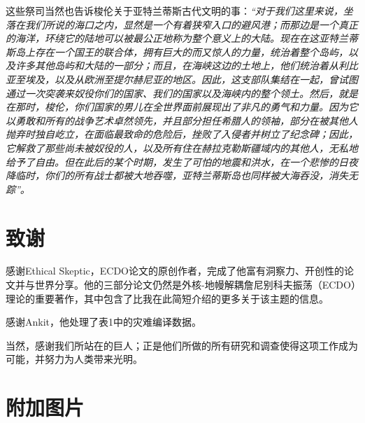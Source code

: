 \documentclass[10pt,twocolumn,letterpaper]{article}
\begin{document}
这些祭司当然也告诉梭伦关于亚特兰蒂斯古代文明的事：\textit{“对于我们这里来说，坐落在我们所说的海口之内，显然是一个有着狭窄入口的避风港；而那边是一个真正的海洋，环绕它的陆地可以被最公正地称为整个意义上的大陆。现在在这亚特兰蒂斯岛上存在一个国王的联合体，拥有巨大的而又惊人的力量，统治着整个岛屿，以及许多其他岛屿和大陆的一部分；而且，在海峡这边的土地上，他们统治着从利比亚至埃及，以及从欧洲至提尔赫尼亚的地区。因此，这支部队集结在一起，曾试图通过一次突袭来奴役你们的国家、我们的国家以及海峡内的整个领土。然后，就是在那时，梭伦，你们国家的男儿在全世界面前展现出了非凡的勇气和力量。因为它以勇敢和所有的战争艺术卓然领先，并且部分担任希腊人的领袖，部分在被其他人抛弃时独自屹立，在面临最致命的危险后，挫败了入侵者并树立了纪念碑；因此，它解救了那些尚未被奴役的人，以及所有住在赫拉克勒斯疆域内的其他人，无私地给予了自由。但在此后的某个时期，发生了可怕的地震和洪水，在一个悲惨的日夜降临时，你们的所有战士都被大地吞噬，亚特兰蒂斯岛也同样被大海吞没，消失无踪”。}

\section{致谢}

感谢Ethical Skeptic，ECDO论文的原创作者，完成了他富有洞察力、开创性的论文并与世界分享。他的三部分论文\cite{1}仍然是外核-地幔解耦詹尼别科夫振荡（ECDO）理论的重要著作，其中包含了比我在此简短介绍的更多关于该主题的信息。

感谢Ankit，他处理了表1中的灾难编译数据。

当然，感谢我们所站在的巨人；正是他们所做的所有研究和调查使得这项工作成为可能，并努力为人类带来光明。

\clearpage
\twocolumn

\section{附加图片}
\end{document}
